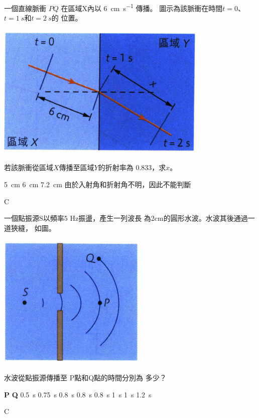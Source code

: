 {
    一個直線脈衝 $PQ$ 在區域X內以 \qty{6}{cm.s^{-1}} 傳播。 圖示為該脈衝在時間$t=0$、$t=\qty{1}{s}$和$t=\qty{2}{s}$的 位置。
    \par{\par\centering\includegraphics[width=.35\textwidth]{./img/ch2_earlyclass_wave_mc_2024-05-13-21-01-10.png}\par}
    若該脈衝從區域$X$傳播至區域$Y$的折射率為 0.833，求$x$。
    \begin{tasks}
        \task \qty{5}{cm}
        \task \qty{6}{cm}
        \task \qty{7.2}{cm}
        \task 由於入射角和折射角不明，因此不能判斷
    \end{tasks}
}{\mckey C}

{
    一個點振源S以頻率5 Hz振盪，產生一列波長 為2cm的圓形水波。水波其後通過一道狹縫， 如圖。
    \par{\par\centering\includegraphics[width=.3\textwidth]{./img/ch2_earlyclass_wave_mc_2024-05-13-21-09-07.png}\par}
    水波從點振源傳播至 P點和Q點的時間分別為 多少？
    \begin{tasks}
        \task \textbf{P} \tab\tab \textbf{Q}
        \task \qty{0.5}{s} \tab\tab \qty{0.75}{s}
        \task \qty{0.8}{s} \tab\tab \qty{0.8}{s}
        \task \qty{0.8}{s} \tab\tab \qty{1}{s}
        \task \qty{1}{s} \tab\tab \qty{1.2}{s}
    \end{tasks}

}{\mckey C}

